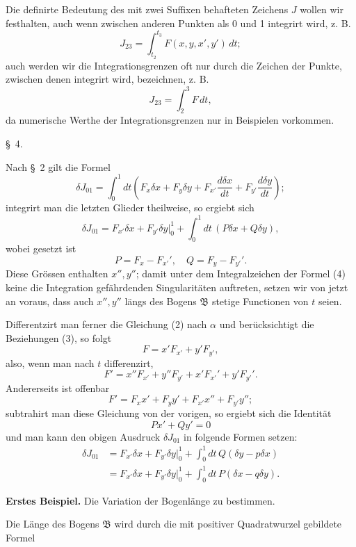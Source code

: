 \documentclass[11pt,a4paper,leqno]{article}
\begin{document}
Die definirte Bedeutung des mit zwei Suffixen behafteten Zeichens $J$ wollen wir festhalten, auch wenn zwischen anderen Punkten als 0 und 1 integrirt wird, z. B.
\[
 J_{23}=\int_{t_2}^{t_3}F(x,y,x',y')\,dt;
\]
auch werden wir die Integrationsgrenzen oft nur durch die Zeichen der Punkte, zwischen denen integrirt wird, bezeichnen, z. B.
\[
 J_{23}=\int_2^3 F\,dt,
\]
da numerische Werthe der Integrationsgrenzen nur in Beispielen vorkommen.


\begin{center}
\S~4.
\end{center}

Nach \S~2 gilt die Formel
\[
\delta J_{01}=\int_0^1 dt\left(F_x\delta x+F_y\delta y+F_{x'}\frac{d\delta x}{dt}+F_{y'}\frac{d\delta y}{dt}\right);
\]
integrirt man die letzten Glieder theilweise, so ergiebt sich
\[
\tag{4}
\delta J_{01}=F_{x'}\delta x+F_{y'}\delta y\bigg|_0^1+\int_0^1dt\,(P\delta x+Q\delta y),
\]
wobei gesetzt ist
\[
P=F_x-F_{x'}',\quad Q=F_y-F_{y'}'.
\]
Diese Grössen enthalten \(x'',y''\); damit unter dem Integralzeichen der Formel (4) keine die Integration gefährdenden Singularitäten auftreten, setzen wir von jetzt an voraus, dass auch \(x'',y''\) längs des Bogens \(\mathfrak B\) stetige Functionen von \(t\) seien.

Differentzirt man ferner die Gleichung (2) nach \(\alpha\) und berücksichtigt die Beziehungen (3), so folgt
\[
F=x'F_{x'}+y'F_{y'},
\]
also, wenn man nach \(t\) differenzirt,
\[
F'=x''F_{x'}+y''F_{y'}+x'F_{x'}'+y'F_{y'}'.
\]
Andererseits ist offenbar
\[
F'=F_xx'+F_yy'+F_{x'}x''+F_{y'}y'';
\]
subtrahirt man diese Gleichung von der vorigen, so ergiebt sich die Identität
\[
\tag{5}
Px'+Qy'=0
\]
und man kann den obigen Ausdruck \(\delta J_{01}\) in folgende Formen setzen:
\[
\tag{6}
\begin{aligned}
\delta J_{01}
&=F_{x'}\delta x+F_{y'}\delta y\bigg|_0^1+\int_0^1dt\,Q(\delta y-p\delta x)\\
&=F_{x'}\delta x+F_{y'}\delta y\bigg|_0^1+\int_0^1dt\,P(\delta x-q\delta y).
\end{aligned}
\]

\medskip
\noindent\textbf{Erstes Beispiel.} Die Variation der Bogenlänge zu bestimmen.

Die Länge des Bogens \(\mathfrak B\) wird durch die mit positiver Quadratwurzel gebildete Formel
\end{document}

